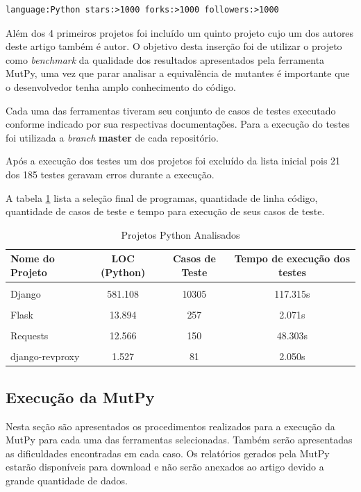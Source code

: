 \documentclass[12pt]{article}
\begin{document}
\begin{verbatim}
language:Python stars:>1000 forks:>1000 followers:>1000
\end{verbatim}

Além dos 4 primeiros projetos foi incluído um quinto projeto
cujo um dos autores deste artigo também é autor. O objetivo 
desta inserção foi de utilizar o projeto como \textit{benchmark}
da qualidade dos resultados apresentados pela ferramenta
MutPy, uma vez que parar analisar a equivalência de mutantes
é importante que o desenvolvedor tenha amplo conhecimento do
código.

Cada uma das ferramentas tiveram seu conjunto de casos de
testes executado conforme indicado por sua respectivas
documentações. Para a execução do testes foi utilizada a
\textit{branch} \textbf{master} de cada repositório.

Após a execução dos testes um dos projetos foi excluído da
lista inicial pois 21 dos 185 testes geravam erros durante a 
execução. 

A tabela \ref{tab:subjects} lista a seleção final de programas,
quantidade de linha código, quantidade de casos de teste e
tempo para execução de seus casos de teste.

\begin{table}[ht]
\centering
\caption{Projetos Python Analisados}
\label{tab:subjects}
\smallskip
\begin{tabular}{|l|c|c|c|}
\hline
Nome do Projeto & LOC (Python) & Casos de Teste & Tempo de execução dos testes\\[0.5ex]
\hline
&&&\\[-2ex]
Django & 581.108 & 10305 & 117.315s\\[0.5ex]
\hline
&&&\\[-2ex]
Flask & 13.894 & 257 & 2.071s\\[0.5ex]
\hline
&&&\\[-2ex]
Requests & 12.566 & 150 & 48.303s\\[0.5ex]
\hline
&&&\\[-2ex]
django-revproxy & 1.527 & 81 & 2.050s\\[0.5ex]
\hline
\end{tabular}
\end{table}

\subsection{Execução da MutPy}

Nesta seção são apresentados os procedimentos realizados para
a execução da MutPy para cada uma das ferramentas selecionadas.
Também serão apresentadas as dificuldades encontradas em cada
caso. Os relatórios gerados pela MutPy estarão disponíveis
para download e não serão anexados ao artigo devido a grande
quantidade de dados.
\end{document}

